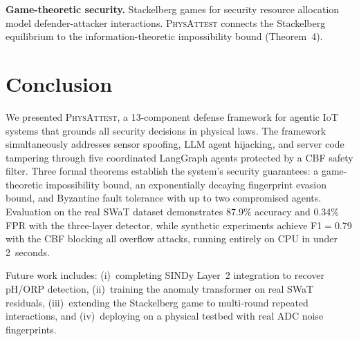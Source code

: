\documentclass[journal]{IEEEtran}
\newcommand{\physattest}{\textsc{PhysAttest}}
\begin{document}
\textbf{Game-theoretic security.} Stackelberg games for security resource allocation~\cite{tambe2011security} model defender-attacker interactions. \physattest{} connects the Stackelberg equilibrium to the information-theoretic impossibility bound (Theorem~4).


\section{Conclusion}
\label{sec:conclusion}

We presented \physattest{}, a 13-component defense framework for agentic IoT systems that grounds all security decisions in physical laws. The framework simultaneously addresses sensor spoofing, LLM agent hijacking, and server code tampering through five coordinated LangGraph agents protected by a CBF safety filter. Three formal theorems establish the system's security guarantees: a game-theoretic impossibility bound, an exponentially decaying fingerprint evasion bound, and Byzantine fault tolerance with up to two compromised agents. Evaluation on the real SWaT dataset demonstrates 87.9\% accuracy and 0.34\% FPR with the three-layer detector, while synthetic experiments achieve F1$=$0.79 with the CBF blocking all overflow attacks, running entirely on CPU in under 2~seconds.

Future work includes: (i)~completing SINDy Layer~2 integration to recover pH/ORP detection, (ii)~training the anomaly transformer on real SWaT residuals, (iii)~extending the Stackelberg game to multi-round repeated interactions, and (iv)~deploying on a physical testbed with real ADC noise fingerprints.



\end{document}
